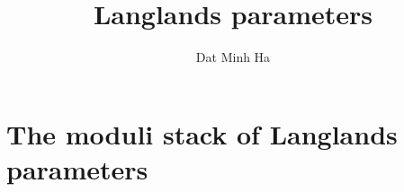 

\setcounter{section}{-1}





	\title{Langlands parameters}
	
	\author{Dat Minh Ha}
	\maketitle
	
	\begin{abstract}
	    
	\end{abstract}
	
	{
      \hypersetup{} 
      \tableofcontents %
    }
    
    \chapter{The moduli stack of Langlands parameters}
        \begin{abstract}
            
        \end{abstract}
        
        \minitoc
    
        
        
        
	
	\printbibliography

